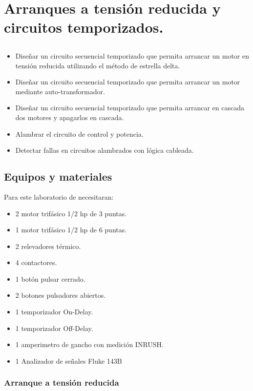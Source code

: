 \chapter{Arranques a tensión reducida y circuitos temporizados.}

\section{\obj}
\capacidad
\begin{itemize}
	\item Diseñar un circuito secuencial temporizado que permita arrancar un motor en tensión reducida utilizando el método de estrella delta.
    \item Diseñar un circuito secuencial temporizado que permita arrancar un motor mediante auto-transformador.
    \item Diseñar un circuito secuencial temporizado que permita arrancar en cascada dos motores y apagarlos en cascada. 
	\item Alambrar el circuito de control y potencia.
	\item Detectar fallas en circuitos alambrados con lógica cableada.
\end{itemize} 

 
\section{Equipos y materiales}
Para este laboratorio de necesitaran:
\begin{itemize}
    \item 2 motor trifásico 1/2 hp de 3 puntas.
	\item 1 motor trifásico 1/2 hp de 6 puntas.
	\item 2 relevadores térmico.
	\item 4 contactores.
	\item 1 botón pulsar cerrado.
	\item 2 botones pulsadores abiertos.
	\item 1 temporizador On-Delay.
	\item 1 temporizador Off-Delay.
	\item 1 amperimetro de gancho con medición INRUSH.
	\item 1 Analizador de señales Fluke 143B
\end{itemize}

\subsection{Arranque a tensión reducida}

